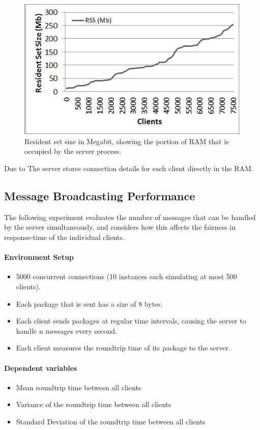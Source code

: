 \documentclass[bsc,frontabs,twoside,singlespacing,parskip,deptreport]{infthesis}     %
\begin{document}
\begin{figure}
\centering
\includegraphics[scale=0.75]{images/test_CLIENT_RSS.jpg}
\caption{Resident set size in Megabit, showing the portion of RAM that is occupied by the server process.}
\label{fig:cpu_rss}
\end{figure}

Due to The server stores connection details for each client directly in the RAM.



\subsection{Message Broadcasting Performance}
The following experiment evaluates the number of messages that can be handled by the server simultaneously, and considers how this affects the fairness in response-time of the individual clients.

\paragraph*{Environment Setup}
\begin{itemize}
\item 5000 concurrent connections (10 instances each simulating at most 500 clients).
\item Each package that is sent has a size of 8 bytes.
\item Each client sends packages at regular time intervals, causing the server to handle n messages every second.
\item Each client measures the roundtrip time of its package to the server.
\end{itemize}

\paragraph*{Dependent variables}
\begin{itemize}
\item Mean roundtrip time between all clients
\item Variance of the roundtrip time between all clients
\item Standard Deviation of the roundtrip time between all clients
\end{itemize}
\end{document}
